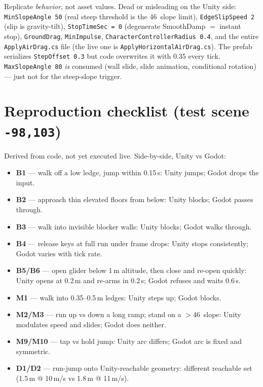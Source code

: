 \documentclass[11pt]{article}
\newcommand{\code}[1]{\texttt{\small #1}}
\begin{document}
Replicate \emph{behavior}, not asset values. Dead or misleading on the Unity side:
\code{MinSlopeAngle 50} (real steep threshold is the 46\textdegree\ slope limit),
\code{EdgeSlipSpeed 2} (slip is gravity-tilt), \code{StopTimeSec\,=\,0} (degenerate
SmoothDamp $=$ instant stop), \code{GroundDrag}, \code{MinImpulse},
\code{CharacterControllerRadius 0.4}, and the entire \code{ApplyAirDrag.cs} file (the live
one is \code{ApplyHorizontalAirDrag.cs}). The prefab serializes \code{StepOffset 0.3} but
code overwrites it with 0.35 every tick. \code{MaxSlopeAngle 80} \emph{is} consumed (wall
slide, slide animation, conditional rotation) --- just not for the steep-slope trigger.

\section{Reproduction checklist (test scene \code{-98,103})}

Derived from code, not yet executed live. Side-by-side, Unity vs Godot:

\begin{itemize}[leftmargin=1.4em, itemsep=1pt]
  \item \textbf{B1} --- walk off a low ledge, jump within 0.15\,s: Unity jumps; Godot drops the input.
  \item \textbf{B2} --- approach thin elevated floors from below: Unity blocks; Godot passes through.
  \item \textbf{B3} --- walk into invisible blocker walls: Unity blocks; Godot walks through.
  \item \textbf{B4} --- release keys at full run under frame drops: Unity stops consistently; Godot varies with tick rate.
  \item \textbf{B5/B6} --- open glider below 1\,m altitude, then close and re-open quickly: Unity opens at 0.2\,m and re-arms in 0.2\,s; Godot refuses and waits 0.6\,s.
  \item \textbf{M1} --- walk into 0.35--0.5\,m ledges: Unity steps up; Godot blocks.
  \item \textbf{M2/M3} --- run up vs down a long ramp; stand on a $>$46\textdegree\ slope: Unity modulates speed and slides; Godot does neither.
  \item \textbf{M9/M10} --- tap vs hold jump: Unity arc differs; Godot arc is fixed and symmetric.
  \item \textbf{D1/D2} --- run-jump onto Unity-reachable geometry: different reachable set (1.5\,m @ 10\,m/s vs 1.8\,m @ 11\,m/s).
\end{itemize}
\end{document}
